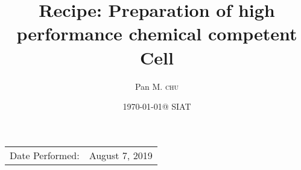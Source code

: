 \documentclass[a4paper, twocolumn]{article}
\title{Recipe: Preparation of  high performance chemical competent Cell} %
\author{Pan M. \textsc{chu}} %
\date{\today @ SIAT} %
\begin{document}
\maketitle %

\begin{center}
\begin{tabular}{l r}
Date Performed: & August 7, 2019 \\ %
\end{tabular}
\end{center}







 
\end{document}
